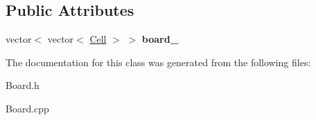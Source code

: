 \subsection*{Public Attributes}
\begin{DoxyCompactItemize}
\item 
vector$<$ vector$<$ \hyperlink{classCell}{Cell} $>$ $>$ {\bfseries board\+\_\+}\hypertarget{classBoard_a85f83047c4d44bbb16704e7bd0970cd0}{}\label{classBoard_a85f83047c4d44bbb16704e7bd0970cd0}

\end{DoxyCompactItemize}


The documentation for this class was generated from the following files\+:\begin{DoxyCompactItemize}
\item 
Board.\+h\item 
Board.\+cpp\end{DoxyCompactItemize}

